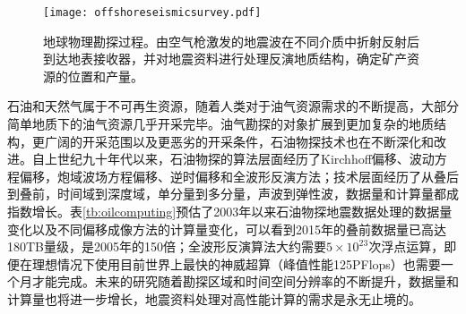 \begin{figure}[t]
  \centering
  \texttt{[image: offshoreseismicsurvey.pdf]}
  \caption{地球物理勘探过程。由空气枪激发的地震波在不同介质中折射反射后到达地表接收器，并对地震资料进行处理反演地质结构，确定矿产资源的位置和产量。}
  \label{fig:offshoreseismicsurvey}
\end{figure}

石油和天然气属于不可再生资源，随着人类对于油气资源需求的不断提高，大部分简单地质下的油气资源几乎开采完毕。油气勘探的对象扩展到更加复杂的地质结构，更广阔的开采范围以及更恶劣的开采条件，石油物探技术也在不断深化和改进。自上世纪九十年代以来，石油物探的算法层面经历了Kirchhoff偏移\cite{yilmaz2001seismic}、波动方程偏移\cite{rickett2002offset}，炮域波场方程偏移\cite{zhang2005theory}、逆时偏移\cite{baysal1983reverse}和全波形反演方法\cite{tarantola1984inversion}；技术层面经历了从叠后到叠前，时间域到深度域，单分量到多分量，声波到弹性波，数据量和计算量都成指数增长\cite{赵改善2009高性能计算在石油物探中的应用现状与前景}。表\ref{tb:oilcomputing}预估了2003年以来石油物探地震数据处理的数据量变化以及不同偏移成像方法的计算量变化\cite{赵改善2009高性能计算在石油物探中的应用现状与前景}，可以看到2015年的叠前数据量已高达180TB量级，是2005年的150倍；全波形反演算法大约需要$5\times10^{23}$次浮点运算，即便在理想情况下使用目前世界上最快的神威超算（峰值性能125PFlops）也需要一个月才能完成。未来的研究随着勘探区域和时间空间分辨率的不断提升，数据量和计算量也将进一步增长，地震资料处理对高性能计算的需求是永无止境的。

